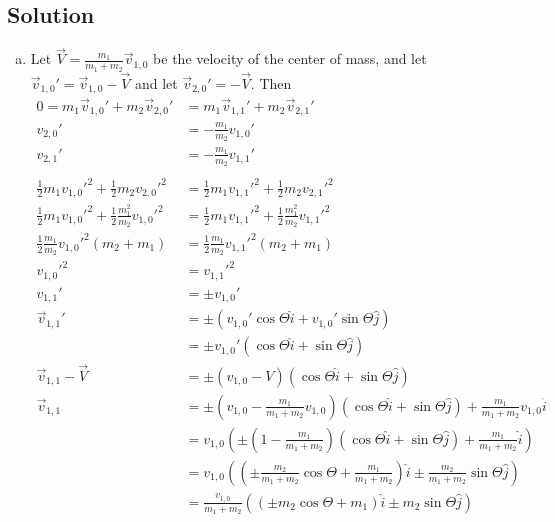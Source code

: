 \documentclass[solutions]{esg8012pset}
\begin{document}
\subsection*{Solution}
  \begin{enumerate}[a)]
    \item Let $\vec V = \frac{m_1}{m_1 + m_2}\vec v_{1,0}$ be the velocity of the center of mass, and let $\vec v_{1,0}' = \vec v_{1, 0} - \vec V$ and let $\vec v_{2, 0}' = -\vec V$.  Then \begin{align*}
    0 = m_1\vec v_{1, 0}' + m_2\vec v_{2,0}' & = m_1\vec v_{1, 1}' + m_2\vec v_{2,1}' \\
    v_{2, 0}' & = -\frac{m_1}{m_2} v_{1,0}' \\
    v_{2, 1}' & = -\frac{m_1}{m_2} v_{1,1}' \\
    \\
    \frac{1}{2}m_1 v_{1, 0}'^2 + \frac{1}{2}m_2 v_{2, 0}'^2 & = \frac{1}{2}m_1 v_{1, 1}'^2 + \frac{1}{2}m_2 v_{2, 1}'^2 \\
    \frac{1}{2}m_1 v_{1, 0}'^2 + \frac{1}{2}\frac{m_1^2}{m_2} v_{1,0}'^2 & = \frac{1}{2}m_1 v_{1, 1}'^2 + \frac{1}{2}\frac{m_1^2}{m_2} v_{1,1}'^2 \\
    \frac{1}{2}\frac{m_1}{m_2} v_{1, 0}'^2(m_2 + m_1) & = \frac{1}{2}\frac{m_1}{m_2} v_{1, 1}'^2(m_2 + m_1) \\
    v_{1, 0}'^2 & = v_{1, 1}'^2 \\
    v_{1, 1}' & = \pm v_{1,0}' \\
    \vec v_{1, 1}' & = \pm (v_{1,0}'\cos\Theta\hat i + v_{1,0}'\sin\Theta \hat j) \\
    & = \pm v_{1,0}'(\cos\Theta\hat i + \sin\Theta \hat j) \\
    \vec v_{1, 1} - \vec V & = \pm (v_{1,0} - V)(\cos\Theta\hat i + \sin\Theta \hat j) \\
    \vec v_{1, 1} & = \pm \left(v_{1,0} - \frac{m_1}{m_1 + m_2} v_{1,0}\right)(\cos\Theta\hat i + \sin\Theta \hat j) + \frac{m_1}{m_1 + m_2}v_{1,0}\hat i \\
    & = v_{1,0}\left(\pm \left(1 - \frac{m_1}{m_1 + m_2}\right)(\cos\Theta\hat i + \sin\Theta \hat j) + \frac{m_1}{m_1 + m_2}\hat i\right) \\
    & = v_{1,0}\left(\left(\pm \frac{m_2}{m_1 + m_2}\cos\Theta + \frac{m_1}{m_1 + m_2}\right)\hat i \pm\frac{m_2}{m_1 + m_2} \sin\Theta \hat j\right) \\
    & = \frac{v_{1,0}}{m_1 + m_2}\left((\pm m_2\cos\Theta + m_1)\hat i \pm m_2\sin\Theta \hat j\right)
    \end{align*}

\end{enumerate}
\end{document}
